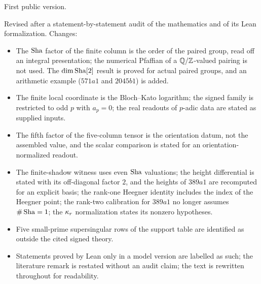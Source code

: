 \begin{description}[leftmargin=2.4em, style=nextline]
\item[v1, 31 August 2026] First public version.
\item[v2, 4 October 2026] Revised after a statement-by-statement audit
  of the mathematics and of its Lean formalization.  Changes:
  \begin{itemize}
  \item The $\operatorname{Sha}$ factor of the finite column is the order of the paired
    group, read off an integral presentation; the numerical Pfaffian of a
    $\mathbb{Q}/\mathbb{Z}$-valued pairing is not used.  The $\dim\operatorname{Sha}[2]$ result is
    proved for actual paired groups, and an arithmetic example
    ($571a1$ and $2045b1$) is added.
  \item The finite local coordinate is the Bloch--Kato logarithm; the
    signed family is restricted to odd $p$ with $a_p=0$; the real readouts
    of $p$-adic data are stated as supplied inputs.
  \item The fifth factor of the five-column tensor is the orientation
    datum, not the assembled value, and the scalar comparison is stated
    for an orientation-normalized readout.
  \item The finite-shadow witness uses even $\operatorname{Sha}$ valuations; the height
    differential is stated with its off-diagonal factor $2$, and the
    heights of $389a1$ are recomputed for an explicit basis; the
    rank-one Heegner identity includes the index of the Heegner point;
    the rank-two calibration for $389a1$ no longer assumes
    $\#\operatorname{Sha}=1$; the $\kappa_r$ normalization states its nonzero hypotheses.
  \item Five small-prime supersingular rows of the support table are
    identified as outside the cited signed theory.
  \item Statements proved by Lean only in a model version are labelled
    as such; the literature remark is restated without an audit claim;
    the text is rewritten throughout for readability.
  \end{itemize}
\end{description}
